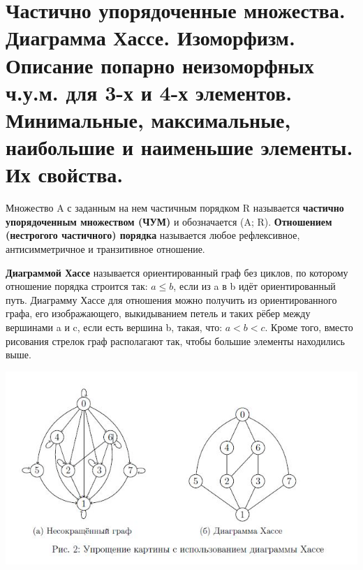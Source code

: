 \setcounter{section}{18}

\section{Частично упорядоченные множества. Диаграмма Хассе. Изоморфизм. Описание попарно неизоморфных ч.у.м. для 3-х и 4-х элементов. Минимальные, максимальные, наибольшие и наименьшие элементы. Их свойства.}

Множество A с заданным на нем частичным порядком R называется \textbf{частично упорядоченным множеством (ЧУМ)} и обозначается (A; R). \textbf{Отношением (нестрогого частичного) порядка} называется любое рефлексивное, антисимметричное и транзитивное отношение. \\ \par

\textbf{Диаграммой Хассе} называется ориентированный граф без циклов, по которому отношение порядка строится так: $a \leqslant b$, если из a в b идёт ориентированный путь. Диаграмму Хассе для отношения можно получить из ориентированного графа, его изображающего, выкидыванием петель и таких рёбер между вершинами a и c, если есть вершина b, такая, что: $a < b < c$. Кроме того, вместо рисования стрелок граф располагают так, чтобы большие элементы находились выше. \par
\includegraphics{images/19_hasse} \par


